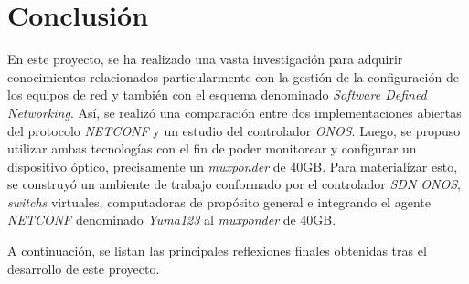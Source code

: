 
\chapter{Conclusión} %

\label{Chapter6} %
En este proyecto, se ha realizado una vasta investigación para adquirir conocimientos relacionados particularmente con la gestión de la configuración de los equipos de red y también con el esquema denominado \textit{Software Defined Networking}. Así, se realizó una comparación entre dos implementaciones abiertas del protocolo \textit{NETCONF} y un estudio del controlador \textit{ONOS}. Luego, se propuso utilizar ambas tecnologías con el fin de poder monitorear y configurar un dispositivo óptico, precisamente un \textit{muxponder} de 40GB. Para materializar esto, se construyó un ambiente de trabajo conformado por el controlador \textit{SDN ONOS}, \textit{switchs} virtuales, computadoras de propósito general e integrando el agente \textit{NETCONF} denominado \textit{Yuma123} al \textit{muxponder} de 40GB.

A continuación, se listan las principales reflexiones finales obtenidas tras el desarrollo de este proyecto.

